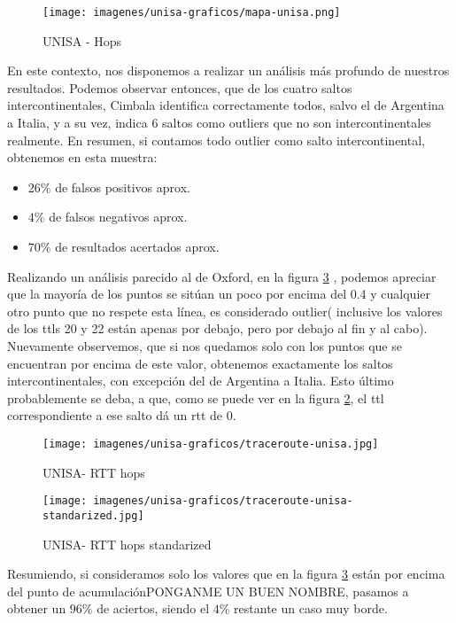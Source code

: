 \newpage

\begin{figure}[!htbp]
  \centering
    \texttt{[image: imagenes/unisa-graficos/mapa-unisa.png]}
  \caption{UNISA - Hops}
  \label{mapa-unisa}
\end{figure}

En este contexto, nos disponemos a realizar un análisis más profundo de nuestros resultados. Podemos observar entonces, que de los cuatro saltos intercontinentales, Cimbala identifica correctamente todos, salvo el de Argentina a Italia, y a su vez, indica 6 saltos como outliers que no son intercontinentales realmente. En resumen, si contamos todo outlier como salto intercontinental, obtenemos en esta muestra:

\begin{itemize}
	\item $26 \% $ de falsos positivos aprox.
	\item $4 \%$ de falsos negativos aprox.
	\item $70 \%$ de resultados acertados aprox.
\end{itemize}

Realizando un análisis parecido al de Oxford, en la figura \ref{fig:2} , podemos apreciar que la mayoría de los puntos se sitúan un poco por encima del 0.4 y cualquier otro punto que no respete esta línea, es considerado outlier( inclusive los valores de los ttls 20 y 22 están apenas por debajo, pero por debajo al fin y al cabo). Nuevamente observemos, que si nos quedamos solo con los puntos que se encuentran por encima de este valor, obtenemos exactamente los saltos intercontinentales, con excepción del de Argentina a Italia. Esto último probablemente se deba, a que, como se puede ver en la figura \ref{fig:1}, el ttl correspondiente a ese salto dá un rtt de 0.

\begin{figure}[!htbp]
  \centering
    \texttt{[image: imagenes/unisa-graficos/traceroute-unisa.jpg]}
  \caption{UNISA- RTT hops}
  \label{fig:1}
\end{figure}


\begin{figure}[!htbp]
  \centering
    \texttt{[image: imagenes/unisa-graficos/traceroute-unisa-standarized.jpg]}
  \caption{UNISA- RTT hops standarized}
  \label{fig:2}
\end{figure}


Resumiendo, si consideramos solo los valores que en la figura \ref{fig:2} están por encima del punto de acumulaciónPONGANME UN BUEN NOMBRE, pasamos a obtener un $96\%$ de aciertos, siendo el $4\%$ restante un caso muy borde.



